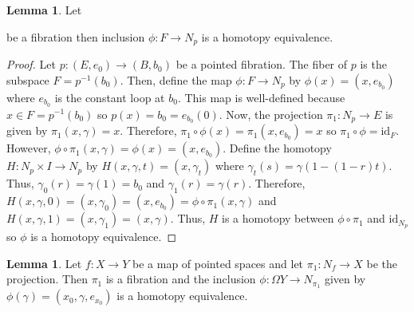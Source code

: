 \documentclass[12pt]{extarticle}
\newcommand{\id}{\mathrm{id}}
\theoremstyle{definition}
\newtheorem{lemma}[theorem]{Lemma}
\begin{document}
\begin{lemma}
Let \begin{center}
\end{center}
be a fibration then inclusion $\phi : F \to N_p$ is a homotopy equivalence.  
\end{lemma}

\begin{proof} \label{fibrationgiveshomotopyfiber}
Let $p : (E, e_0) \to (B, b_0)$ be a pointed fibration. The fiber of $p$ is the subspace $F = p^{-1}(b_0)$. Then, define the map $\phi : F \to N_p$ by $\phi(x) = (x, e_{b_0})$ where $e_{b_0}$ is the constant loop at $b_0$. This map is well-defined because $x \in F = p^{-1}(b_0)$ so $p(x) = b_0 = e_{b_0}(0)$. Now, the projection $\pi_1 : N_p \to E$ is given by $\pi_1(x, \gamma) = x$. Therefore, $\pi_1 \circ \phi(x) = \pi_1(x, e_{b_0}) = x$ so $\pi_1 \circ \phi = \id_F$. However, $\phi \circ \pi_1(x, \gamma) = \phi(x) = (x, e_{b_0})$. Define the homotopy $H : N_p \times I \to N_p$ by $H(x, \gamma, t) = (x, \gamma_t)$ where $\gamma_t(s) = \gamma(1 - (1 - r) t)$. Thus, $\gamma_0(r) = \gamma(1) = b_0$ and $\gamma_1(r) = \gamma(r)$. Therefore, $H(x, \gamma, 0) = (x, \gamma_0) = (x, e_{b_0}) = \phi \circ \pi_1(x, \gamma)$ and $H(x, \gamma, 1) = (x, \gamma_1) = (x, \gamma)$. Thus, $H$ is a homotopy between $\phi \circ \pi_1$ and $\id_{N_p}$ so $\phi$ is a homotopy equivalence. 
\end{proof}

\begin{lemma} \label{mappingcoclyinderhasfibration}
Let $f : X \to Y$ be a map of pointed spaces and let $\pi_1 : N_f \to X$ be the projection. Then $\pi_1$ is a fibration and the inclusion $\phi : \Omega Y \to N_{\pi_1}$ given by $\phi(\gamma) = (x_0, \gamma, e_{x_0})$ is a homotopy equivalence.
\end{lemma}
\end{document}
